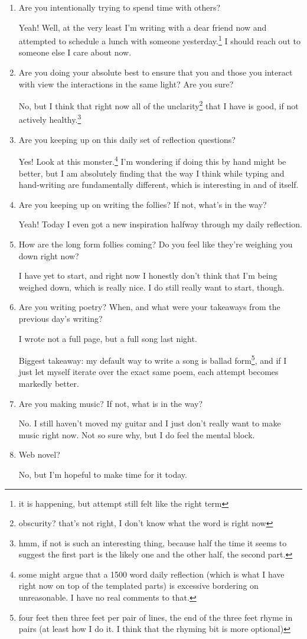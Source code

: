 \documentclass[12pt]{article}
\renewcommand{\,}{\textsuperscript{,}}
\begin{document}
\begin{enumerate}
\item Are you intentionally trying to spend time with others?

Yeah! Well, at the very least I'm writing with a dear friend now and attempted to schedule a lunch with someone yesterday.\footnote{it is happening, but attempt still felt like the right term}  
I should reach out to someone else I care about now.

\item Are you doing your absolute best to ensure that you and those you interact with view the interactions in the same light? Are you sure?

No, but I think that right now all of the unclarity\footnote{obscurity? that's not right, I don't know what the word is right now} that I have is good, if not actively healthy.\footnote{hmm, if not is such an interesting thing, because half the time it seems to suggest the first part is the likely one and the other half, the second part.}

\item Are you keeping up on this daily set of reflection questions?

Yes! Look at this monster.\footnote{some might argue that a 1500 word daily reflection (which is what I have right now on top of the templated parts) is excessive bordering on unreasonable. I have no real comments to that.} I'm wondering if doing this by hand might be better, but I am absolutely finding that the way I think while typing and hand-writing are fundamentally different, which is interesting in and of itself.

\item Are you keeping up on writing the follies? If not, what's in the way?

Yeah! Today I even got a new inspiration halfway through my daily reflection.

\item How are the long form follies coming? Do you feel like they're weighing you down right now?

I have yet to start, and right now I honestly don't think that I'm being weighed down, which is really nice.  
I do still really want to start, though.

\item Are you writing poetry? When, and what were your takeaways from the previous day's writing?

I wrote not a full page, but a full song last night.

Biggest takeaway: my default way to write a song is ballad form\footnote{four feet then three feet per pair of lines, the end of the three feet rhyme in pairs (at least how I do it. I think that the rhyming bit is more optional)}, and if I just let myself iterate over the exact same poem, each attempt becomes markedly better.

\item Are you making music? If not, what is in the way?

No. I still haven't moved my guitar and I just don't really want to make music right now. Not so sure why, but I do feel the mental block.

\item Web novel?

No, but I'm hopeful to make time for it today.

\end{enumerate}
\end{document}

